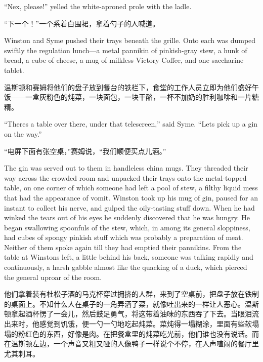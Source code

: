\begin{paracol}{2}
``Nex\textquotesingle, please!'' yelled the white-aproned prole with the
ladle.

\switchcolumn

``下一个！''一个系着白围裙，拿着勺子的人喊道。

\switchcolumn*

Winston and Syme pushed their trays beneath the grille. Onto each was
dumped swiftly the regulation lunch---a metal pannikin of pinkish-gray
stew, a hunk of bread, a cube of cheese, a mug of milkless Victory
Coffee, and one saccharine tablet.

\switchcolumn

温斯顿和赛姆将他们的盘子放到餐台的铁栏下，食堂的工作人员立即为他们盛好午饭——一盒灰粉色的炖菜，一块面包，一块干酪，一杯不加奶的胜利咖啡和一片糖精。

\switchcolumn*

``There\textquotesingle s a table over there, under that telescreen,''
said Syme. ``Let\textquotesingle s pick up a gin on the way.''

\switchcolumn

``电屏下面有张空桌，''赛姆说，``我们顺便买点儿酒。''

\switchcolumn*

The gin was served out to them in handleless china mugs. They threaded
their way across the crowded room and unpacked their trays onto the
metal-topped table, on one corner of which someone had left a pool of
stew, a filthy liquid mess that had the appearance of vomit. Winston
took up his mug of gin, paused for an instant to collect his nerve, and
gulped the oily-tasting stuff down. When he had winked the tears out of
his eyes he suddenly discovered that he was hungry. He began swallowing
spoonfuls of the stew, which, in among its general sloppiness, had cubes
of spongy pinkish stuff which was probably a preparation of meat.
Neither of them spoke again till they had emptied their pannikins. From
the table at Winston\textquotesingle s left, a little behind his back,
someone was talking rapidly and continuously, a harsh gabble almost like
the quacking of a duck, which pierced the general uproar of the room.

\switchcolumn

他们拿着装有杜松子酒的马克杯穿过拥挤的人群，来到了空桌前，把盘子放在铁制的桌面上。不知什么人在桌子的一角弄洒了菜，就像吐出来的一样让人恶心。温斯顿拿起酒杯愣了一会儿，然后鼓足勇气，将这带着油味的东西吞了下去。当眼泪流出来时，他感觉到饥饿，便一勺一勺地吃起炖菜。菜炖得一塌糊涂，里面有些软塌塌的粉红色的东西，好像是肉。在把餐盒里的炖菜吃光前，他们谁也没有说话。而在温斯顿左边，一个声音又粗又哑的人像鸭子一样说个不停，在人声喧闹的餐厅里尤其刺耳。


\end{paracol}
